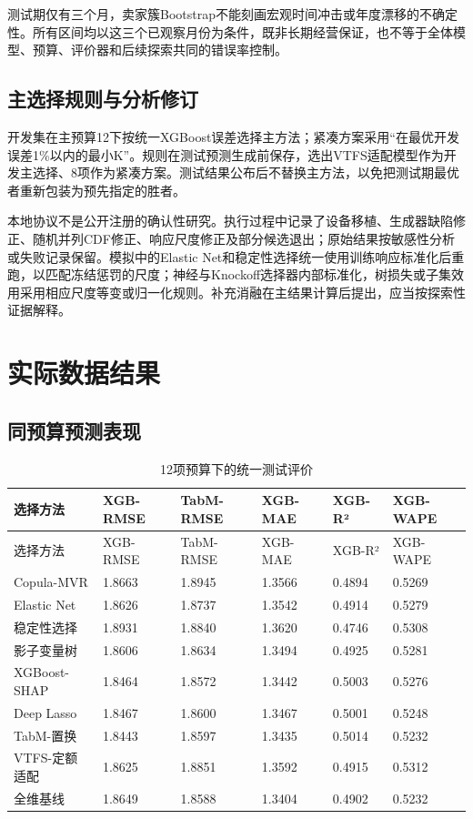\documentclass{sufethesismas}
\begin{document}
测试期仅有三个月，卖家簇Bootstrap不能刻画宏观时间冲击或年度漂移的不确定性。所有区间均以这三个已观察月份为条件，既非长期经营保证，也不等于全体模型、预算、评价器和后续探索共同的错误率控制。

\section{主选择规则与分析修订}

开发集在主预算12下按统一XGBoost误差选择主方法；紧凑方案采用``在最优开发误差1\%以内的最小K''。规则在测试预测生成前保存，选出VTFS适配模型作为开发主选择、8项作为紧凑方案。测试结果公布后不替换主方法，以免把测试期最优者重新包装为预先指定的胜者。

本地协议不是公开注册的确认性研究。执行过程中记录了设备移植、生成器缺陷修正、随机并列CDF修正、响应尺度修正及部分候选退出；原始结果按敏感性分析或失败记录保留。模拟中的Elastic Net和稳定性选择统一使用训练响应标准化后重跑，以匹配冻结惩罚的尺度；神经与Knockoff选择器内部标准化，树损失或子集效用采用相应尺度等变或归一化规则。补充消融在主结果计算后提出，应当按探索性证据解释。

\chapter{实际数据结果}

\section{同预算预测表现}

{
\footnotesize
\begin{longtable}[]{@{}llllll@{}}
\caption{12项预算下的统一测试评价}\tabularnewline
\toprule\noalign{}
选择方法 & XGB-RMSE & TabM-RMSE & XGB-MAE & XGB-R² & XGB-WAPE \\
\midrule\noalign{}
\endfirsthead
\toprule\noalign{}
选择方法 & XGB-RMSE & TabM-RMSE & XGB-MAE & XGB-R² & XGB-WAPE \\
\midrule\noalign{}
\endhead
\bottomrule\noalign{}
\endlastfoot
Copula-MVR & 1.8663 & 1.8945 & 1.3566 & 0.4894 & 0.5269 \\
Elastic Net & 1.8626 & 1.8737 & 1.3542 & 0.4914 & 0.5279 \\
稳定性选择 & 1.8931 & 1.8840 & 1.3620 & 0.4746 & 0.5308 \\
影子变量树 & 1.8606 & 1.8634 & 1.3494 & 0.4925 & 0.5281 \\
XGBoost-SHAP & 1.8464 & 1.8572 & 1.3442 & 0.5003 & 0.5276 \\
Deep Lasso & 1.8467 & 1.8600 & 1.3467 & 0.5001 & 0.5248 \\
TabM-置换 & 1.8443 & 1.8597 & 1.3435 & 0.5014 & 0.5232 \\
VTFS-定额适配 & 1.8625 & 1.8851 & 1.3592 & 0.4915 & 0.5312 \\
全维基线 & 1.8649 & 1.8588 & 1.3404 & 0.4902 & 0.5232 \\
\end{longtable}
}
\end{document}
